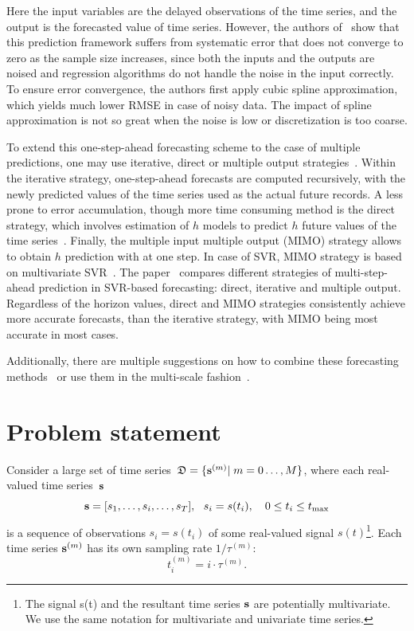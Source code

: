 \documentclass[conference]{IEEEtran}
\begin{document}
 Here the input variables are the delayed observations  of the time series, and the output is the forecasted value of time series. However, the authors of~\cite{Navarrete2015} show that this prediction framework suffers from systematic error that does not converge to zero as the sample size increases, since both the inputs and the outputs are noised and regression algorithms do not handle the noise in the input correctly. To ensure error convergence, the authors first apply cubic spline approximation, which yields much lower RMSE in case of noisy data. The impact of spline approximation is not so great when the noise is low or discretization is too coarse.

 To extend this one-step-ahead forecasting scheme to the case of multiple predictions, one may use iterative, direct or multiple output strategies~\cite{Bao2014}. Within the iterative strategy, one-step-ahead forecasts are computed recursively, with the newly predicted values of the time series used as the actual future records. A less prone to error accumulation, though more time consuming method is the direct strategy, which involves estimation of $h$ models to predict $h$ future values of the time series~\cite{Zhang2013}. Finally, the multiple input multiple output (MIMO) strategy allows to obtain $h$ prediction with at one step. In case of SVR, MIMO strategy is based on multivariate SVR~\cite{PerezCruz2002}. The paper~\cite{Bao2014} compares different strategies of multi-step-ahead prediction in SVR-based forecasting: direct, iterative and multiple output. Regardless of the horizon values, direct and MIMO strategies consistently achieve more accurate forecasts, than the iterative strategy, with MIMO being most accurate in most cases.

Additionally, there are multiple suggestions on how to combine these forecasting methods~\cite{Qiu2014, Grover2015} or use them in the multi-scale fashion~\cite{Chen2004, Zhu2012, Cui2016, Bai2015, Ferrari2012}.


\section{Problem statement}
Consider a large set of time series~${\mathfrak{D}}=\{{\mathbf{s}}^{(m)}| \; m = 0\dots, {M}\}$, where each real-valued time series~${\mathbf{s}}$
\[ {\mathbf{s}} = [s_1, \dots, s_i, \dots, s_{T}], ~~ s_i = s(t_i),\quad 0 \leq t_i \leq t_{\max}\]
is a sequence of observations $s_i = s(t_i)$ of some real-valued signal $s(t)$\footnote{The signal s(t) and the resultant time series ${\mathbf{s}}$ are potentially multivariate. We use the same notation for multivariate and univariate time series. }.
Each time series ${\mathbf{s}}^{(m)}$ has its own sampling rate $1/\tau^{(m)}$:
\[t_i^{(m)} = {i}\cdot\tau^{(m)}.\]
\end{document}
